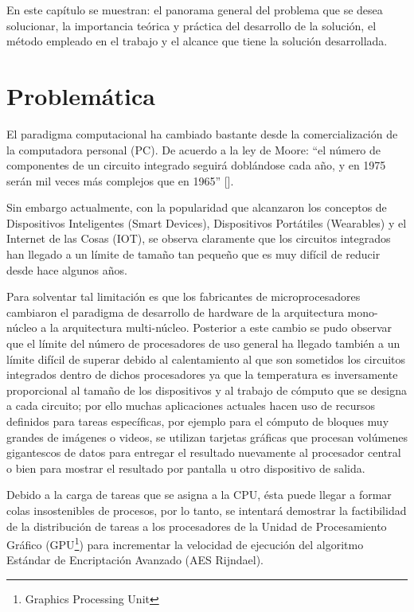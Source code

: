 \documentclass[../main/main.tex]{subfiles}
\begin{document}
\espacio

  En este capítulo se muestran: el panorama general del problema que se desea solucionar, la importancia teórica y práctica del desarrollo de la solución, el método empleado en el trabajo y el alcance que tiene la solución desarrollada.

  \section{Problemática}

  El paradigma computacional ha cambiado bastante desde la comercialización de la computadora personal (PC). De acuerdo a la ley de Moore: ``el número de componentes de un circuito integrado seguirá doblándose cada año, y en 1975 serán mil veces más complejos que en 1965'' [\cite[p.~2]{article:ley_de_moore}].

  Sin embargo actualmente, con la popularidad que alcanzaron los conceptos de Dispositivos Inteligentes (Smart Devices), Dispositivos Portátiles (Wearables) y el Internet de las Cosas (IOT), se observa claramente que los circuitos integrados han llegado a un límite de tamaño tan pequeño que es muy difícil de reducir desde hace algunos años.

  Para solventar tal limitación es que los fabricantes de microprocesadores cambiaron el paradigma de desarrollo de hardware de la arquitectura mono-núcleo a la arquitectura multi-núcleo. Posterior a este cambio se pudo observar que el límite del número de procesadores de uso general ha llegado también a un límite difícil de superar debido al calentamiento al que son sometidos los circuitos integrados dentro de dichos procesadores ya que la temperatura es inversamente proporcional al tamaño de los dispositivos y al trabajo de cómputo que se designa a cada circuito; por ello muchas aplicaciones actuales hacen uso de recursos definidos para tareas específicas, por ejemplo para el cómputo de bloques muy grandes de imágenes o videos, se utilizan tarjetas gráficas que procesan volúmenes gigantescos de datos para entregar el resultado nuevamente al procesador central o bien para mostrar el resultado por pantalla u otro dispositivo de salida.

  Debido a la carga de tareas que se asigna a la CPU, ésta puede llegar a formar colas insostenibles de procesos, por lo tanto, se intentará demostrar la factibilidad de la distribución de tareas a los procesadores de la Unidad de Procesamiento Gráfico (GPU\footnote{Graphics Processing Unit}) para incrementar la velocidad de ejecución del algoritmo Estándar de Encriptación Avanzado (AES Rijndael).
\end{document}
